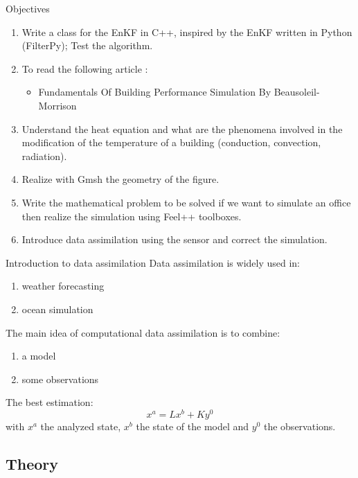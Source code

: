 
\begin{frame}[allowframebreaks]{Objectives}
		
    \begin{enumerate}[\textbullet]
        \item Write a class for the EnKF in C++, inspired by the EnKF written in Python (FilterPy); Test the algorithm.
        \item To read the following article :
        \begin{itemize}
            \item Fundamentals Of Building Performance Simulation By Beausoleil-Morrison
        \end{itemize}
        
    \item Understand the heat equation and what are the phenomena involved in the modification of the temperature of a building (conduction, convection, radiation).
    \item Realize with Gmsh the geometry of the figure.
    \item Write the mathematical problem to be solved if we want to simulate an office then realize the simulation using Feel++ toolboxes.
    \item Introduce data assimilation using the sensor and correct the simulation.
    \end{enumerate}
\end{frame}




\begin{frame}{Introduction to data assimilation}
Data assimilation is widely used in:
\begin{enumerate}[\textbullet]
       \item weather forecasting
       \item ocean simulation
\end{enumerate}	 
      The main idea of computational data assimilation is to combine:
\begin{enumerate}[\textbullet]
       \item a model
       \item some observations
\end{enumerate}	 
The best estimation:
$$x^a=Lx^b+Ky^0$$
with $x^a$ the analyzed state, $x^b$ the state of the model and $y^0$ the observations.
\end{frame}
\subsection{Theory}

